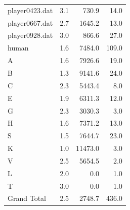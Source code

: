 \begin{table}[htbp]
\begin{tabular}{rrrr}
          \multicolumn{1}{l}{player0423.dat} & 3.1    & 730.9  & 14.0 \\
          \multicolumn{1}{l}{player0667.dat} & 2.7    & 1645.2 & 13.0 \\
          \multicolumn{1}{l}{player0928.dat} & 3.0    & 866.6  & 27.0 \\
          \multicolumn{1}{l}{human} & 1.6    & 7484.0 & 109.0 \\
          \hline
          \multicolumn{1}{l}{A} & 1.6    & 7926.6 & 19.0 \\
          \multicolumn{1}{l}{B} & 1.3    & 9141.6 & 24.0 \\
          \multicolumn{1}{l}{C} & 2.3    & 5443.4 & 8.0 \\
          \multicolumn{1}{l}{E} & 1.9    & 6311.3 & 12.0 \\
          \multicolumn{1}{l}{G} & 2.3    & 3030.3 & 3.0 \\
          \multicolumn{1}{l}{H} & 1.6    & 7371.2 & 13.0 \\
          \multicolumn{1}{l}{S} & 1.5    & 7644.7 & 23.0 \\
          \multicolumn{1}{l}{K} & 1.0    & 11473.0 & 3.0 \\
          \multicolumn{1}{l}{V} & 2.5    & 5654.5 & 2.0 \\
          \multicolumn{1}{l}{L} & 2.0    & 0.0    & 1.0 \\
          \multicolumn{1}{l}{T} & 3.0    & 0.0    & 1.0 \\
          \multicolumn{1}{l}{Grand Total} & 2.5    & 2748.7 & 436.0 \\
          \bottomrule
          \end{tabular}%
        \label{tab:addlabel}%
      \end{table}%
